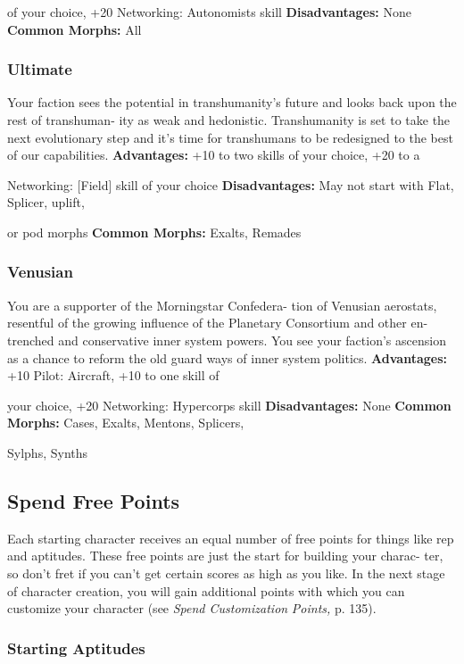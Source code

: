 of your choice, +20 Networking: Autonomists skill
\textbf{Disadvantages:} None
\textbf{Common Morphs:} All

\subsubsection{Ultimate}

Your faction sees the potential in transhumanity's 
future and looks back upon the rest of transhuman-
ity as weak and hedonistic. Transhumanity is set 
to take the next evolutionary step and it's time for 
transhumans to be redesigned to the best of our 
capabilities.
\textbf{Advantages:} +10 to two skills of your choice, +20 to a 

Networking: [Field] skill of your choice
\textbf{Disadvantages:} May not start with Flat, Splicer, uplift, 

or pod morphs
\textbf{Common Morphs: }Exalts, Remades

\subsubsection{Venusian}

You are a supporter of the Morningstar Confedera-
tion of Venusian aerostats, resentful of the growing 
influence of the Planetary Consortium and other en-
trenched and conservative inner system powers. You 
see your faction's ascension as a chance to reform the 
old guard ways of inner system politics.
\textbf{Advantages:} +10 Pilot: Aircraft, +10 to one skill of 

your choice, +20 Networking: Hypercorps skill
\textbf{Disadvantages:} None
\textbf{Common Morphs:} Cases, Exalts, Mentons, Splicers, 

Sylphs, Synths

\subsection{Spend Free Points}

Each starting character receives an equal number of 
free points for things like rep and aptitudes. These 
free points are just the start for building your charac-
ter, so don't fret if you can't get certain scores as high 
as you like. In the next stage of character creation, 
you will gain additional points with which you can 
customize your character (see \textit{Spend Customization }
\textit{Points,} p. 135).

\subsubsection{Starting Aptitudes}

